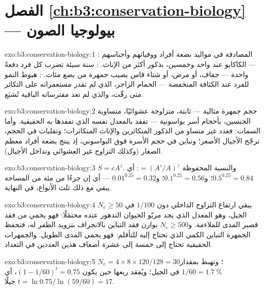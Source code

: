 \section*{الفصل \ref{ch:b3:conservation-biology} --- بيولوجيا الصون}

\begin{solution}{exo:b3:conservation-biology:1}
: المصادفة في مواليد بضعة أفراد
ووفياتهم وأجناسهم --- الكاكابو عند واحد وخمسين، بذكور أكثر من
الإناث. : سنة سيئة تضرب كل فرد
دفعةً واحدة --- جفاف، أو مرض، أو شتاء قاس يصيب
جمهرة من بضع مئات. : هبوط النمو للفرد
عند الكثافة المنخفضة --- الحمام الزاجر، الذي لم تقدر مستعمراته على التكاثر
متى رقّت، والذي لم تعد مفترساته الباقية
تُشبَع.
\end{solution}

\begin{solution}{exo:b3:conservation-biology:2}
حجم جمهرة مثالية --- ثابتة، متزاوجة عشوائيًا، متساوية
الجنسين، بأحجام أسر بواسونية --- تفقد 
بالمعدل نفسه الذي تفقدها به الحقيقية. وأما السمات: فعدد غير متساو من الذكور
المتكاثرين والإناث المتكاثرات؛ وتقلبات في الحجم، ترجّح الأجيال الأصغر؛
وتباين في حجم الأسرة فوق البواسوني، إذ ينتج بضعة أفراد
معظم الصغار (وكذلك التزاوج غير العشوائي وتداخل
الأجيال).
\end{solution}

\begin{solution}{exo:b3:conservation-biology:3}
$S = cA^{z}$. والنسبة المحفوظة $= (A'/A)^{z}$: أي $0.5^{0.25} = 0.84$؛
و$0.1^{0.25} = 0.56$؛ و$0.01^{0.25} = 0.32$ --- أي إن جزءًا من مئة من المساحة
يبقي مع ذلك ثلث الأنواع، في النهاية.
\end{solution}

\begin{solution}{exo:b3:conservation-biology:4}
$N_{e} \ge 50$ يبقي ارتفاع التزاوج الداخلي دون $1/100$ في
الجيل، وهو المعدل الذي يجد مربّو الحيوان التدهور عنده
محتمَلًا: فهو يحمي من فقد قصير المدى للملاءمة. و$N_{e} \ge
500$ يوازن فقد التباين بالانجراف بتزويد الطفر
له، فتحفظ الجمهرة التباين الكمي الذي تحتاج إليه
للتأقلم: فهو يحمي المدى الطويل. والجمهرات الحقيقية تحتاج إلى خمسة إلى عشرة
أضعاف هذين العددين في التعداد.
\end{solution}

\begin{solution}{exo:b3:conservation-biology:5}
$N_{e} = 4\times 8\times 120/128 = 30$؛ وتهبط  بمقدار $1/60 =
\qty{1.7}{\%}$ في الجيل؛ ويُفقد ربعها حين يكون $(1 - 1/60)^{t} =
0.75$، أي $t = \ln 0.75/\ln(59/60) = 17$ جيلًا.
\end{solution}

